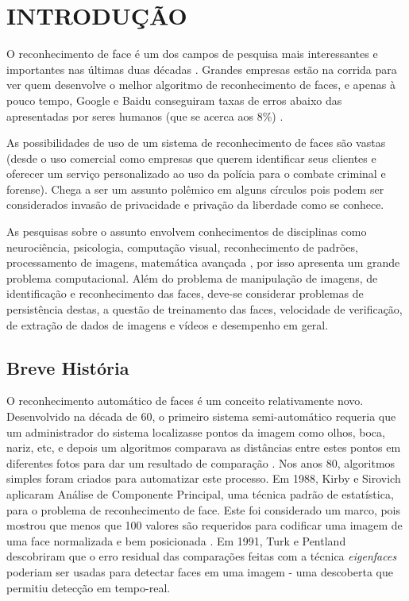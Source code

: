 
\chapter{INTRODUÇÃO}\label{ch:introducao}

O reconhecimento de face é um dos campos de pesquisa mais interessantes e importantes nas últimas duas décadas \cite{wei_lun}. Grandes empresas estão na corrida para ver quem desenvolve o melhor algoritmo de reconhecimento de faces, e apenas à pouco tempo, Google e Baidu conseguiram taxas de erros abaixo das apresentadas por seres humanos (que se acerca aos 8\%) \cite{stats_economy_compass_2017}.
 
As possibilidades de uso de um sistema de reconhecimento de faces são vastas (desde o uso comercial como empresas que querem identificar seus clientes e oferecer um serviço personalizado ao uso da polícia para o combate criminal e forense). Chega a ser um assunto polêmico em alguns círculos pois podem ser considerados invasão de privacidade e privação da liberdade como se conhece.

As pesquisas sobre o assunto envolvem conhecimentos de disciplinas como neurociência, psicologia, computação visual, reconhecimento de padrões, processamento de imagens, matemática avançada \cite{wei_lun}, por isso apresenta um grande problema computacional. Além do problema de manipulação de imagens,  de identificação e reconhecimento das faces, deve-se considerar problemas de persistência destas, a questão de treinamento das faces, velocidade de verificação, de extração de dados de imagens e vídeos e desempenho em geral.


\section{Breve História}\label{sec:historia}

O reconhecimento automático de faces é um conceito relativamente novo. Desenvolvido na década de 60, o primeiro sistema semi-automático requeria que um administrador do sistema localizasse pontos da imagem como olhos, boca, nariz,  etc, e depois um algoritmos comparava as distâncias entre estes pontos em diferentes fotos para dar um resultado de comparação \cite{nstc_homeland}. Nos anos 80, algoritmos simples foram criados para automatizar este processo. Em 1988, Kirby e Sirovich aplicaram Análise de Componente Principal, uma técnica padrão de estatística, para o problema de reconhecimento de face. Este foi considerado um marco, pois mostrou que menos que 100 valores são requeridos para codificar uma imagem de uma face normalizada e bem posicionada \cite{nstc_homeland}. Em 1991, Turk e Pentland descobriram que o erro residual das comparações feitas com a técnica \textit{eigenfaces} poderiam ser usadas para detectar faces em uma imagem - uma descoberta que permitiu detecção em tempo-real. 

